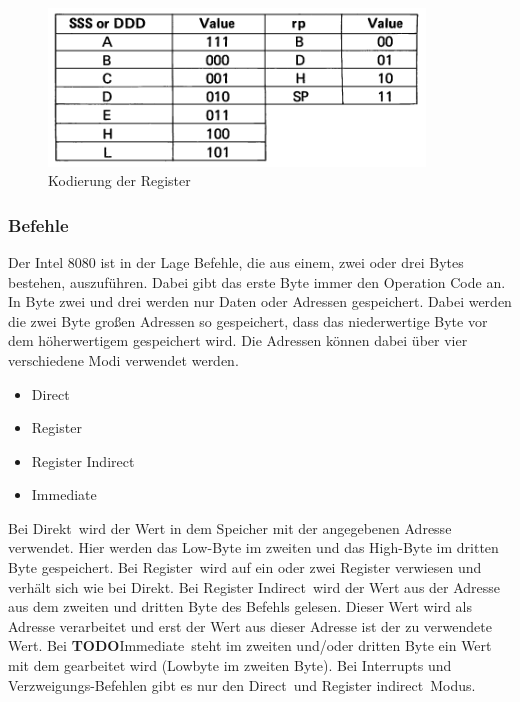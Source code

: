 \documentclass[12pt]{article}
\newcommand{\imgSpaceBefore}{\vspace{10pt}}
\newcommand{\todo}{\textbf{TODO}}
\begin{document}
\imgSpaceBefore
\begin{figure}[h]
\centering
\includegraphics[width=10cm]{Bilder/register_kodierung}
\caption{Kodierung der Register}
\label{fig:register_kodierung}
\end{figure}

\subsubsection{Befehle}

Der Intel 8080 ist in der Lage Befehle, die aus einem, zwei oder drei Bytes bestehen, auszuführen. Dabei gibt das erste Byte immer den Operation Code an. In Byte zwei und drei werden nur Daten oder Adressen gespeichert. Dabei werden die zwei Byte großen Adressen so gespeichert, dass das niederwertige Byte vor dem höherwertigem gespeichert wird. Die Adressen können dabei über vier verschiedene Modi verwendet werden.

\begin{itemize}
\item Direct
\item Register
\item Register Indirect
\item Immediate
\end{itemize}

\noindent
Bei \glqq Direkt\grqq\ wird der Wert in dem Speicher mit der angegebenen Adresse verwendet. Hier werden das Low-Byte im zweiten und das High-Byte im dritten Byte gespeichert. Bei \glqq Register\grqq\ wird auf ein oder zwei Register verwiesen und verhält sich wie bei Direkt. Bei \glqq Register Indirect\grqq\ wird der Wert aus der Adresse aus dem zweiten und dritten Byte des Befehls gelesen. Dieser Wert wird als Adresse verarbeitet und erst der Wert aus dieser Adresse ist der zu verwendete Wert. Bei \todo \glqq Immediate\grqq\ steht 
im zweiten und/oder dritten Byte ein Wert mit dem gearbeitet wird (Lowbyte im zweiten Byte).
Bei Interrupts und Verzweigungs-Befehlen gibt es nur den \glqq Direct\grqq\ und \glqq Register indirect\grqq\ Modus. \cite{IntMan45}
\\ 
\end{document}
